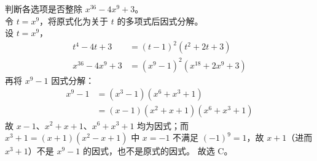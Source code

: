 \documentclass[12pt,a4paper]{exam-zh}
\begin{document}
\begin{solution}
    判断各选项是否整除 $x^{36}-4x^9+3$。\\
    令 $t=x^9$，将原式化为关于 $t$ 的多项式后因式分解。\\
    设 $t=x^9$，
    \begin{align*}
        t^4 - 4t + 3 &= (t-1)^2(t^2+2t+3) \\
        x^{36}-4x^9+3 &= (x^9-1)^2\left(x^{18}+2x^9+3\right)
    \end{align*}
    再将 $x^9-1$ 因式分解：
    \begin{align*}
        x^9 - 1 &= (x^3-1)(x^6+x^3+1) \\
        &= (x-1)(x^2+x+1)(x^6+x^3+1)
    \end{align*}
    故 $x-1$、$x^2+x+1$、$x^6+x^3+1$ 均为因式；而 $x^3+1=(x+1)(x^2-x+1)$ 中 $x=-1$ 不满足 $(-1)^9=1$，故 $x+1$（进而 $x^3+1$）不是 $x^9-1$ 的因式，也不是原式的因式。
    故选 C。
\end{solution}



\end{document}
